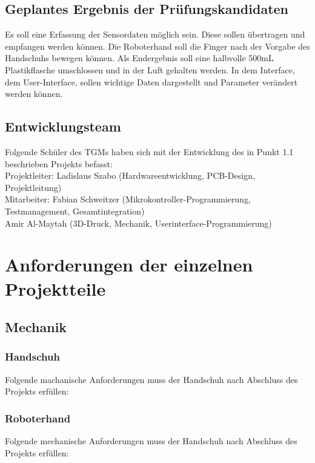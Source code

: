 \documentclass[11pt]{article}
\begin{document}
\subsection{Geplantes Ergebnis der Prüfungskandidaten}
Es soll eine Erfassung der Sensordaten möglich sein. Diese sollen übertragen und empfangen
werden können. Die Roboterhand soll die Finger nach der Vorgabe des Handschuhs bewegen
können. Als Endergebnis soll eine halbvolle 500mL Plastikflasche umschlossen und in der Luft
gehalten werden. In dem Interface, dem User-Interface, sollen wichtige Daten dargestellt und
Parameter verändert werden können.

\subsection{Entwicklungsteam}
Folgende Schüler des TGMs haben sich mit der Entwicklung des in Punkt 1.1 beschrieben Projekts befasst: \hfill \break
\\
Projektleiter:    Ladislaus Szabo (Hardwareentwicklung, PCB-Design, Projektleitung)\\
Mitarbeiter: Fabian Schweitzer (Mikrokontroller-Programmierung, Testmanagement, Gesamtintegration)\\
Amir Al-Maytah (3D-Druck, Mechanik, Userinterface-Programmierung)

\hfill \break
\hfill \break
\hfill \break
\hfill \break
\hfill \break
\hfill \break
\hfill \break
\hfill \break


\section{Anforderungen der einzelnen Projektteile}

\subsection{Mechanik}
\subsubsection{Handschuh}
Folgende machanische Anforderungen muss der Handschuh nach Abschluss des Projekts erfüllen:

\subsubsection{Roboterhand}
Folgende mechanische Anforderungen muss der Handschuh nach Abschluss des Projekts erfüllen:
\end{document}
